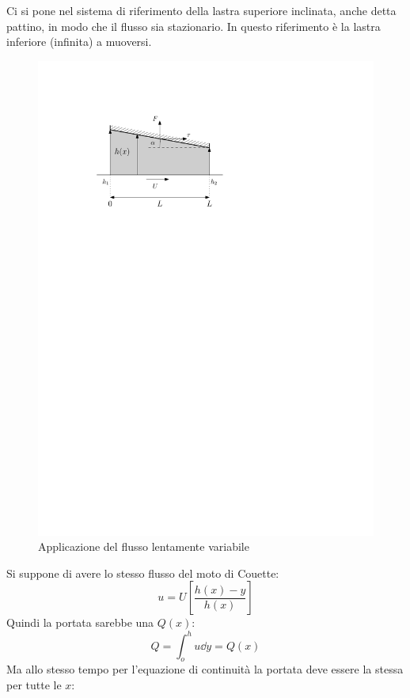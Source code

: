 Ci si pone nel sistema di riferimento della lastra superiore inclinata, anche detta pattino, in modo che il flusso sia stazionario.
In questo riferimento è la lastra inferiore (infinita) a muoversi.
%
	\begin{figure}[ht]
		\includegraphics[scale=0.9]{./6.3 Teoria della lubrificazione/6.3-1}
		\centering
		\caption{Applicazione del flusso lentamente variabile}
	\end{figure}
%
Si suppone di avere lo stesso flusso del moto di Couette:
%
	\begin{equation*}
		u = U \left[ \frac{h(x) - y}{h(x)} \right]
	\end{equation*}
%
Quindi la portata sarebbe una $Q(x)$:
%
	\begin{equation*}
		Q = \int_o^h u \dd{y} = Q(x)
	\end{equation*}
%
Ma allo stesso tempo per l'equazione di continuità la portata deve essere la stessa per tutte le $x$:
